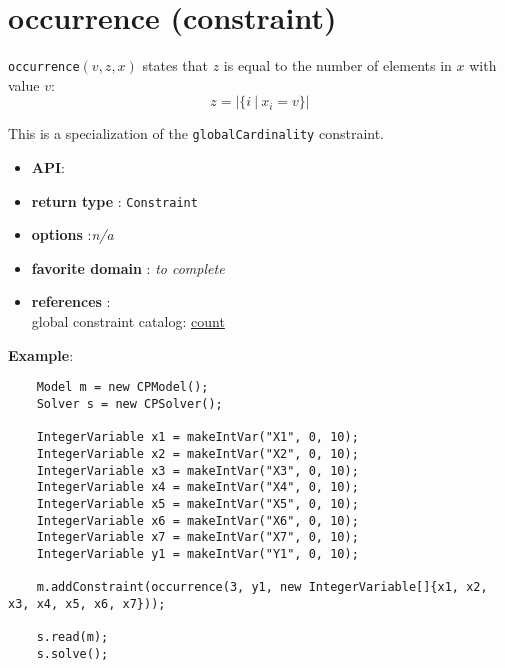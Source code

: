 \label{occurrence}
\hypertarget{occurrence}{}

\section{occurrence (constraint)}\label{occurrence:occurrenceconstraint}\hypertarget{occurrence:occurrenceconstraint}{}
\begin{notedef}
  \texttt{occurrence}$(v,z,x)$ states that $z$ is equal to the number of elements in $x$ with value $v$:
$$z=|\{i\ |\ x_i=v\}|$$   
\end{notedef}
  This is a specialization of the \texttt{globalCardinality} constraint.

\begin{itemize}
	\item \textbf{API}: 
	\item \textbf{return type} : \texttt{Constraint}
	\item \textbf{options} :\emph{n/a}
	\item \textbf{favorite domain} : \emph{to complete}
	\item \textbf{references} :\\
      global constraint catalog: \href{http://www.emn.fr/x-info/sdemasse/gccat/Ccount.html}{count}
\end{itemize}

\textbf{Example}:
\begin{lstlisting}
	Model m = new CPModel();
	Solver s = new CPSolver();
	
	IntegerVariable x1 = makeIntVar("X1", 0, 10);
	IntegerVariable x2 = makeIntVar("X2", 0, 10);
	IntegerVariable x3 = makeIntVar("X3", 0, 10);
	IntegerVariable x4 = makeIntVar("X4", 0, 10);
	IntegerVariable x5 = makeIntVar("X5", 0, 10);
	IntegerVariable x6 = makeIntVar("X6", 0, 10);
	IntegerVariable x7 = makeIntVar("X7", 0, 10);
	IntegerVariable y1 = makeIntVar("Y1", 0, 10);
	
	m.addConstraint(occurrence(3, y1, new IntegerVariable[]{x1, x2, x3, x4, x5, x6, x7}));
	
	s.read(m);
	s.solve();
\end{lstlisting} 
